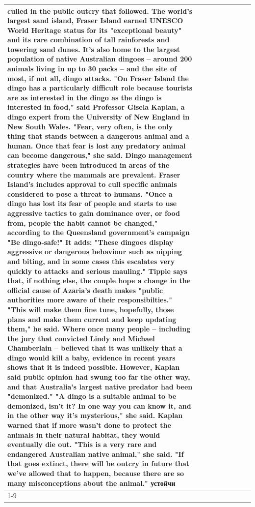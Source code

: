 \begin{table}[H]
\begin{tabular}{lllrlllll}
culled in the public outcry that followed. The world's largest sand island, Fraser Island earned UNESCO World Heritage status for its "exceptional beauty" and its rare combination of tall rainforests and towering sand dunes. It's also home to the largest population of native Australian dingoes -- around 200 animals living in up to 30 packs -- and the site of most, if not all, dingo attacks. "On Fraser Island the dingo has a particularly difficult role because tourists are as interested in the dingo as the dingo is interested in food," said Professor Gisela Kaplan, a dingo expert from the University of New England in New South Wales. "Fear, very often, is the only thing that stands between a dangerous animal and a human. Once that fear is lost any predatory animal can become dangerous," she said. Dingo management strategies have been introduced in areas of the country where the mammals are prevalent. Fraser Island's includes approval to cull specific animals considered to pose a threat to humans. "Once a dingo has lost its fear of people and starts to use aggressive tactics to gain dominance over, or food from, people the habit cannot be changed," according to the Queensland government's campaign "Be dingo-safe!" It adds: "These dingoes display aggressive or dangerous behaviour such as nipping and biting, and in some cases this escalates very quickly to attacks and serious mauling." Tipple says that, if nothing else, the couple hope a change in the official cause of Azaria's death makes "public authorities more aware of their responsibilties." "This will make them fine tune, hopefully, those plans and make them current and keep updating them," he said. Where once many people -- including the jury that convicted Lindy and Michael Chamberlain -- believed that it was unlikely that a dingo would kill a baby, evidence in recent years shows that it is indeed possible. However, Kaplan said public opinion had swung too far the other way, and that Australia's largest native predator had been "demonized." "A dingo is a suitable animal to be demonized, isn't it? In one way you can know it, and in the other way it's mysterious," she said. Kaplan warned that if more wasn't done to protect the animals in their natural habitat, they would eventually die out. "This is a very rare and endangered Australian native animal," she said. "If that goes extinct, there will be outcry in future that we've allowed that to happen, because there are so many misconceptions about the animal." устойчи \\
\cline{1-9}

\end{tabular}
\end{table}
